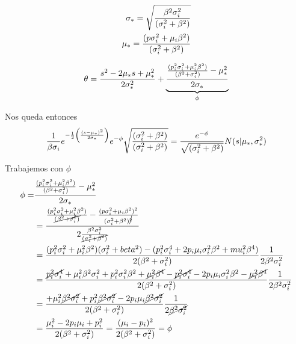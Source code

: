 \documentclass[11pt,twoside,spanish]{report} %
\begin{document}
\begin{equation}
	\centering
	\begin{split}
		\sigma_{\ast}=\sqrt{\frac{\beta^2\sigma_i^2}{(\sigma_i^2+\beta^2)}}\\
		\mu_{\ast}=\frac{(p\sigma_i^2+\mu_i\beta^2)}{(\sigma_i^2+\beta^2)}
	\end{split}
\end{equation}

\begin{equation}
	\centering
	\begin{split}
		\theta =\frac{s^2-2\mu_{\ast}s+\mu_{\ast}^2}{2\sigma_{\ast}^2} + \underbrace{\frac{\frac{(p_i^2\sigma_i^2+\mu_i^2\beta^2)}{(\beta^2+\sigma_i^2)}-\mu_{\ast}^2}{2\sigma_{\ast}}}_{\phi}
	\end{split}
\end{equation}

Nos queda entonces
\begin{equation}
	\centering
	\frac{1}{\beta\sigma_i}e^{-\frac{1}{2}\left( \frac{(s-\mu_{\ast})^2}{2\sigma_{\ast}}\right)}e^{-\phi}\sqrt{\frac{(\sigma_i^2+\beta^2)}{(\sigma_i^2+\beta^2)}}
	= \frac{e^{-\phi}}{\sqrt{(\sigma_i^2+\beta^2)}}N(s \vert\mu_{\ast},\sigma_{\ast}^2)
\end{equation}

Trabajemos con $\phi$
\begin{equation}
	\centering
	\begin{split}
		\phi = & \frac{\frac{(p_i^2\sigma_i^2+\mu_i^2\beta^2)}{(\beta^2+\sigma_i^2)}-\mu_{\ast}^2}{2\sigma_{\ast}}\\
		& = \frac{\frac{(p_i^2\sigma_i^2+\mu_i^2\beta^2)}{\cancel{(\beta^2+\sigma_i^{2})}}-\frac{(p\sigma_i^2+\mu_i\beta^2)^2}{(\sigma_i^2+\beta^2)^{\cancel{2}}}}{2\frac{\beta^2\sigma_i^2}{\cancel{(\sigma_i^2+\beta^2)}}}\\
		& =\frac{(p_i^2\sigma_i^2+\mu_i^2\beta^2)(\sigma_i^2+beta^2)-(p_i^2\sigma_i^4+2p_i\mu_i\sigma_i^2\beta^2+mu_i^2\beta^4)}{2(\beta^2+\sigma_i^2)}\frac{1}{2\beta^2\sigma_i^2}\\
		& = \frac{\cancel{p_i^2\sigma_i^4}+\mu_i^2\beta^2\sigma_i^2+p_i^2\sigma_i^2\beta^2+\cancel{\mu_i^2\beta^4}-\cancel{p_i^2\sigma_i^4}-2p_i\mu_i\sigma_i^2\beta^2-\cancel{\mu_i^2\beta^4}}{2(\beta^2+\sigma_i^2)}\frac{1}{2\beta^2\sigma_i^2}\\
		& = \frac{+\mu_i^2\cancel{\beta^2\sigma_i^2}+p_i^2\cancel{\beta^2\sigma_i^2}-2p_i\mu_i\cancel{\beta^2\sigma_i^2}}{2(\beta^2+\sigma_i^2)}\frac{1}{2\cancel{\beta^2\sigma_i^2}}\\
		& = \frac{\mu_i^2-2p_i\mu_i+p_i^2}{2(\beta^2+\sigma_i^2)} = \frac{(\mu_i-p_i)^2}{2(\beta^2+\sigma_i^2)} = \phi
	\end{split}
\end{equation}
\end{document}

